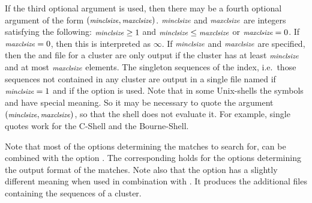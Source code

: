 \documentclass[12pt,titlepage]{article}
\newcommand{\Minclsize}[0]{\Showoptionarg{minclsize}}
\newcommand{\Maxclsize}[0]{\Showoptionarg{maxclsize}}
\begin{document}
\begin{AboutVmatch}
\begin{Justshowoptions}
{If the third optional argument is used, then there may be a fourth
optional argument of the form \((\Minclsize,\Maxclsize)\). 
\(\Minclsize\) and \(\Maxclsize\) are integers
satisfying the following: \(\Minclsize\geq 1\) and 
\(\Minclsize\leq\Maxclsize\) 
or \(\Maxclsize=0\). If \(\Maxclsize=0\), then this is interpreted 
as \(\infty\).
If \(\Minclsize\) and \(\Maxclsize\) are specified, then the 
 and  file for a cluster
are only output if the cluster has at least \(\Minclsize\) and
at most \(\Maxclsize\) elements. 
The singleton sequences of the index,
i.e.\ those sequences not contained in any cluster are output in a 
single file named 
if \(\Minclsize=1\) and
if the option  is used. Note that in some Unix-shells
the symbols \texttt{} and \texttt{} have special
meaning. So it may be necessary to quote the argument 
\((\Minclsize,\Maxclsize)\), so that the shell does not evaluate it. 
For example, single quotes work for the C-Shell and the Bourne-Shell.

Note that most of the options determining the matches to search for,
can be combined with the option . The corresponding 
holds for the options determining the output format of the matches. Note also
that the option  has a slightly different meaning when used
in combination with . It produces the additional
 files containing the sequences of a cluster.
}



\end{Justshowoptions}
\end{AboutVmatch}
\end{document}
